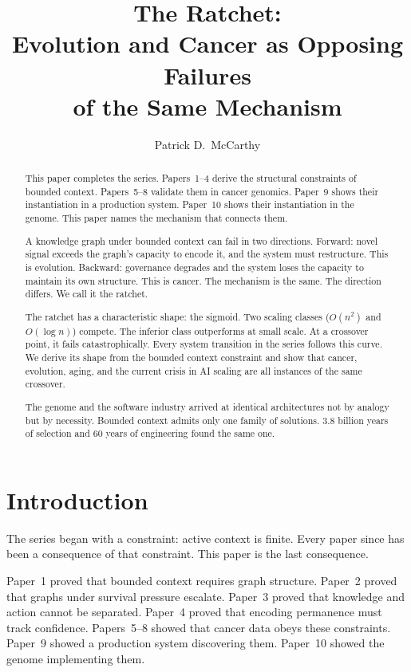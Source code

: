 \documentclass[11pt]{article}
\title{The Ratchet:\\Evolution and Cancer as Opposing Failures\\of the Same Mechanism}
\author{Patrick D.\ McCarthy}
\date{}
\theoremstyle{definition}
\begin{document}
\maketitle

\begin{abstract}
This paper completes the series. Papers~1--4 derive the structural
constraints of bounded context. Papers~5--8 validate them in cancer
genomics. Paper~9 shows their instantiation in a production system.
Paper~10 shows their instantiation in the genome. This paper names
the mechanism that connects them.

A knowledge graph under bounded context can fail in two directions.
Forward: novel signal exceeds the graph's capacity to encode it, and
the system must restructure. This is evolution. Backward: governance
degrades and the system loses the capacity to maintain its own
structure. This is cancer. The mechanism is the same. The direction
differs. We call it the ratchet.

The ratchet has a characteristic shape: the sigmoid. Two scaling
classes ($O(n^2)$ and $O(\log n)$) compete. The inferior class
outperforms at small scale. At a crossover point, it fails
catastrophically. Every system transition in the series follows
this curve. We derive its shape from the bounded context constraint
and show that cancer, evolution, aging, and the current crisis in
AI scaling are all instances of the same crossover.

The genome and the software industry arrived at identical
architectures not by analogy but by necessity. Bounded context
admits only one family of solutions. 3.8 billion years of selection
and 60 years of engineering found the same one.
\end{abstract}

\section{Introduction}
\label{sec:intro}

The series began with a constraint: active context is finite. Every
paper since has been a consequence of that constraint. This paper is
the last consequence.

Paper~1 proved that bounded context requires graph structure.
Paper~2 proved that graphs under survival pressure escalate.
Paper~3 proved that knowledge and action cannot be separated.
Paper~4 proved that encoding permanence must track confidence.
Papers~5--8 showed that cancer data obeys these constraints.
Paper~9 showed a production system discovering them.
Paper~10 showed the genome implementing them.
\end{document}
